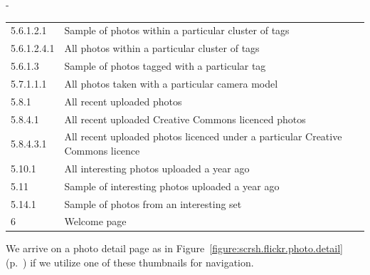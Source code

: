 \begin{table}[!b]
\begin{adjustwidth*}{0em}{-\wholemargin}
\begin{center}
\begin{tabular}{ll}
        5.6.1.2.1 &
        Sample of  photos within a particular cluster of tags \\

        5.6.1.2.4.1 &
        All photos within a particular cluster of tags \\

        5.6.1.3 &
        Sample of photos tagged with a particular tag \\

        5.7.1.1.1 &
        All photos taken with a particular camera model \\

        5.8.1 &
        All recent uploaded photos \\

        5.8.4.1 &
        All recent uploaded Creative Commons licenced photos \\

        5.8.4.3.1 &
        All recent uploaded photos licenced under a particular Creative
        Commons licence \\

        5.10.1 &
        All interesting photos uploaded a year ago \\

        5.11 &
        Sample of interesting photos uploaded a year ago \\

        5.14.1 &
        Sample of photos from an interesting set \\




        6 &
        Welcome page \\

        \bottomrule

      \end{tabular}
    \end{center}
  \end{adjustwidth*}
\end{table}

We arrive on a photo detail page as in
Figure~\ref{figure:scrsh.flickr.photo.detail}
(p.~\pageref{figure:scrsh.flickr.photo.detail})
if we utilize one of these thumbnails for navigation.


